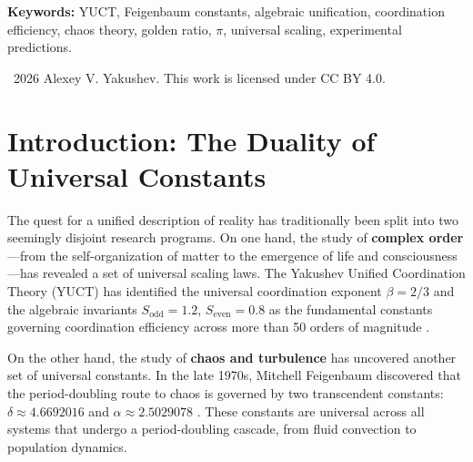 \documentclass[12pt,a4paper]{article}
\begin{document}
{\begin{abstract}
			The small deviation \(\Delta\pi = |\pi - S_{\mathrm{odd}}\varphi^2| \approx 4.8\times10^{-5}\) is interpreted as a falsifiable prediction of YUCT, pointing to a measurable granularity of physical geometry. Experimental tests using gravitational wave interferometry (LISA), cosmological surveys (Euclid), and quantum interferometry are proposed. This work provides the first mathematical bridge between YUCT, the renormalisation group theory of critical phenomena, and the theory of computational irreducibility, offering profound implications for the prediction of systemic collapse and the experimental verification of YUCT's core tenets.
		\end{abstract}
		
		\vspace{1cm}
		\noindent
		\small\textbf{Keywords:} YUCT, Feigenbaum constants, algebraic unification, coordination efficiency, chaos theory, golden ratio, \(\pi\), universal scaling, experimental predictions.
		
		\vspace{0.5cm}
		\noindent
		\textcopyright\ 2026 Alexey V. Yakushev. This work is licensed under CC BY 4.0.
	
	
	\tableofcontents
	\newpage
	
	\section{Introduction: The Duality of Universal Constants}
	
	The quest for a unified description of reality has traditionally been split into two seemingly disjoint research programs. On one hand, the study of \textbf{complex order}—from the self-organization of matter to the emergence of life and consciousness—has revealed a set of universal scaling laws. The Yakushev Unified Coordination Theory (YUCT) has identified the universal coordination exponent \(\beta = 2/3\) and the algebraic invariants \(S_{\mathrm{odd}} = 1.2\), \(S_{\mathrm{even}} = 0.8\) as the fundamental constants governing coordination efficiency across more than 50 orders of magnitude \cite{Yakushev2026, AppendixAF}.
	
	On the other hand, the study of \textbf{chaos and turbulence} has uncovered another set of universal constants. In the late 1970s, Mitchell Feigenbaum discovered that the period-doubling route to chaos is governed by two transcendent constants: \(\delta \approx 4.6692016\) and \(\alpha \approx 2.5029078\) \cite{Feigenbaum1978}. These constants are universal across all systems that undergo a period-doubling cascade, from fluid convection to population dynamics.
	
}
\end{document}
